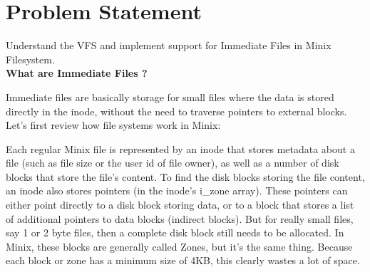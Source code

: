 \chapter{Problem Statement}

\vspace{10mm}

\large Understand the VFS and implement support for Immediate Files in Minix Filesystem. \\

\textbf{What are Immediate Files ?}

Immediate files are basically storage for small files where the data is stored directly in the inode, without the need to traverse pointers to external blocks. Let's first review how file systems work in Minix:

Each regular Minix file is represented by an inode that stores metadata about a file (such as file size or the user id of file owner), as well as a number of disk blocks that store the file's content. To find the disk blocks storing the file content, an inode also stores pointers (in the inode's i\_zone array). These pointers can either point directly to a disk block storing data, or to a block that stores a list of additional pointers to data blocks (indirect blocks). But for really small files, say 1 or 2 byte files, then a complete disk block still needs to be allocated. In Minix, these blocks are generally called Zones, but it's the same thing. Because each block or zone has a minimum size of 4KB, this clearly wastes a lot of space.

